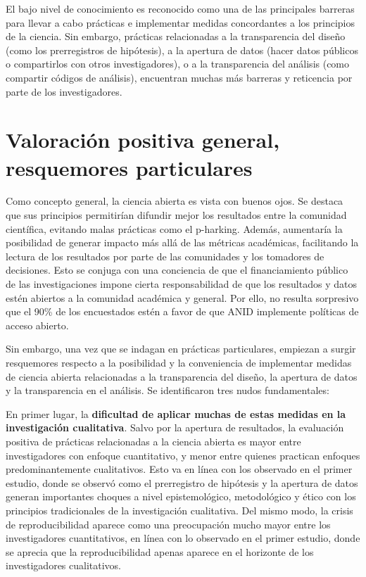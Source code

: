 \documentclass[
  letterpaper,
  DIV=11,
  numbers=noendperiod]{scrreprt}
\begin{document}
El bajo nivel de conocimiento es reconocido como una de las principales
barreras para llevar a cabo prácticas e implementar medidas concordantes
a los principios de la ciencia. Sin embargo, prácticas relacionadas a la
transparencia del diseño (como los prerregistros de hipótesis), a la
apertura de datos (hacer datos públicos o compartirlos con otros
investigadores), o a la transparencia del análisis (como compartir
códigos de análisis), encuentran muchas más barreras y reticencia por
parte de los investigadores.

\section{Valoración positiva general, resquemores
particulares}\label{valoraciuxf3n-positiva-general-resquemores-particulares}

Como concepto general, la ciencia abierta es vista con buenos ojos. Se
destaca que sus principios permitirían difundir mejor los resultados
entre la comunidad científica, evitando malas prácticas como el
p-harking. Además, aumentaría la posibilidad de generar impacto más allá
de las métricas académicas, facilitando la lectura de los resultados por
parte de las comunidades y los tomadores de decisiones. Esto se conjuga
con una conciencia de que el financiamiento público de las
investigaciones impone cierta responsabilidad de que los resultados y
datos estén abiertos a la comunidad académica y general. Por ello, no
resulta sorpresivo que el 90\% de los encuestados estén a favor de que
ANID implemente políticas de acceso abierto.

Sin embargo, una vez que se indagan en prácticas particulares, empiezan
a surgir resquemores respecto a la posibilidad y la conveniencia de
implementar medidas de ciencia abierta relacionadas a la transparencia
del diseño, la apertura de datos y la transparencia en el análisis. Se
identificaron tres nudos fundamentales:

En primer lugar, la \textbf{dificultad de aplicar muchas de estas
medidas en la investigación cualitativa}. Salvo por la apertura de
resultados, la evaluación positiva de prácticas relacionadas a la
ciencia abierta es mayor entre investigadores con enfoque cuantitativo,
y menor entre quienes practican enfoques predominantemente cualitativos.
Esto va en línea con los observado en el primer estudio, donde se
observó como el prerregistro de hipótesis y la apertura de datos generan
importantes choques a nivel epistemológico, metodológico y ético con los
principios tradicionales de la investigación cualitativa. Del mismo
modo, la crisis de reproducibilidad aparece como una preocupación mucho
mayor entre los investigadores cuantitativos, en línea con lo observado
en el primer estudio, donde se aprecia que la reproducibilidad apenas
aparece en el horizonte de los investigadores cualitativos.
\end{document}
